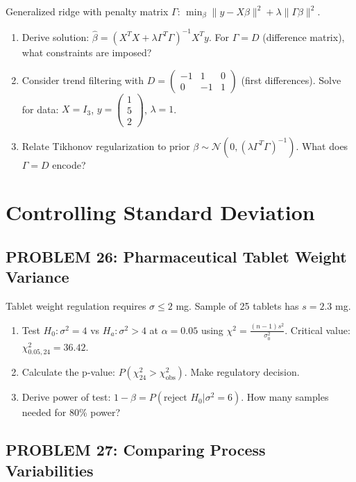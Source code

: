 \documentclass[12pt]{article}
\begin{document}
Generalized ridge with penalty matrix \(\Gamma\): \(\min_\beta \|y - X\beta\|^2 + \lambda\|\Gamma\beta\|^2\).

\begin{enumerate}
\item[(a)] Derive solution: \(\hat{\beta} = (X^TX + \lambda\Gamma^T\Gamma)^{-1}X^Ty\). For \(\Gamma = D\) (difference matrix), what constraints are imposed?
\item[(b)] Consider trend filtering with \(D = \begin{pmatrix} -1 & 1 & 0 \\ 0 & -1 & 1 \end{pmatrix}\) (first differences). Solve for data: \(X=I_3\), \(y = \begin{pmatrix} 1 \\ 5 \\ 2 \end{pmatrix}\), \(\lambda=1\).
\item[(c)] Relate Tikhonov regularization to prior \(\beta \sim \mathcal{N}(0, (\lambda\Gamma^T\Gamma)^{-1})\). What does \(\Gamma = D\) encode?
\end{enumerate}

\newpage
\section*{Controlling Standard Deviation}

\subsection*{PROBLEM 26: Pharmaceutical Tablet Weight Variance}

Tablet weight regulation requires \(\sigma \leq 2\) mg. Sample of 25 tablets has \(s = 2.3\) mg.

\begin{enumerate}
\item[(a)] Test \(H_0: \sigma^2 = 4\) vs \(H_a: \sigma^2 > 4\) at \(\alpha = 0.05\) using \(\chi^2 = \frac{(n-1)s^2}{\sigma_0^2}\). Critical value: \(\chi^2_{0.05,24} = 36.42\).
\item[(b)] Calculate the p-value: \(P(\chi^2_{24} > \chi^2_{\text{obs}})\). Make regulatory decision.
\item[(c)] Derive power of test: \(1-\beta = P(\text{reject } H_0 | \sigma^2 = 6)\). How many samples needed for 80\% power?
\end{enumerate}

\subsection*{PROBLEM 27: Comparing Process Variabilities}
\end{document}
